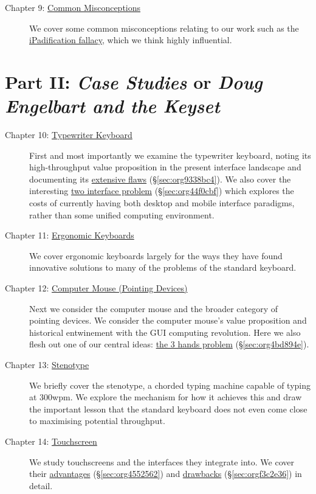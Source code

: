 \documentclass[logo,bsc,singlespacing,parskip]{infthesis}
\begin{document}
\begin{description}
\begin{description}
\item[{Chapter 9: \hyperref[sec:org650adbc]{Common Misconceptions}}] We cover some common misconceptions relating to our work such as the \hyperref[ipadification fallacy]{iPadification fallacy}, which we think highly influential.
\end{description}
\end{description}

\section*{Part II: \emph{Case Studies} or \emph{Doug Engelbart and the Keyset}}
\label{sec:org1bf2814}
\begin{description}
\item[{Chapter 10: \hyperref[sec:org20f3860]{Typewriter Keyboard}}] First and most importantly we examine the typewriter keyboard, noting its high-throughput value proposition in the present interface landscape and documenting its \hyperref[sec:org9338bc4]{extensive flaws} (\S \ref{sec:org9338bc4}).
We also cover the interesting \hyperref[sec:org44f0cbf]{two interface problem} (\S \ref{sec:org44f0cbf}) which explores the costs of currently having both desktop and mobile interface paradigms, rather than some unified computing environment.

\item[{Chapter 11: \hyperref[sec:org895c4cc]{Ergonomic Keyboards}}] We cover ergonomic keyboards largely for the ways they have found innovative solutions to many of the problems of the standard keyboard.

\item[{Chapter 12: \hyperref[sec:org9f2dc02]{Computer Mouse (Pointing Devices)}}] Next we consider the computer mouse and the broader category of pointing devices.
We consider the computer mouse's value proposition and historical entwinement with the GUI computing revolution.
Here we also flesh out one of our central ideas: \hyperref[sec:org4bd894e]{the 3 hands problem} (\S \ref{sec:org4bd894e}).

\item[{Chapter 13: \hyperref[sec:orgdb71557]{Stenotype} }] We briefly cover the stenotype, a chorded typing machine capable of typing at 300wpm.
We explore the mechanism for how it achieves this and draw the important lesson that the standard keyboard does not even come close to maximising potential throughput.

\item[{Chapter 14:  \hyperref[sec:org492bcd7]{Touchscreen}}] We study touchscreens and the interfaces they integrate into.
We cover their \hyperref[sec:org4552562]{advantages} (\S \ref{sec:org4552562}) and \hyperref[sec:orgf3c2e36]{drawbacks} (\S \ref{sec:orgf3c2e36}) in detail.


\end{description}
\end{document}
